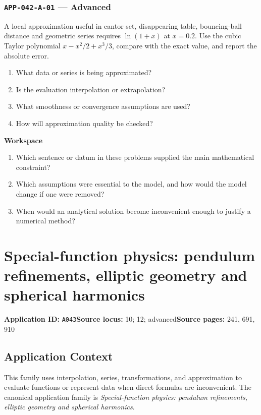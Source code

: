 \documentclass[11pt]{book}
\newcommand{\pid}[1]{\texttt{#1}}
\newcommand{\workspace}{\par\vspace{0.7in}\hrulefill\par\vspace{0.55in}\hrulefill\par}
\begin{document}
\subsection*{\pid{APP-042-A-01} — Advanced}
\begin{problembox}
A local approximation useful in cantor set, disappearing table, bouncing-ball distance and geometric series requires $\ln(1+x)$ at $x=0.2$. Use the cubic Taylor polynomial $x-x^2/2+x^3/3$, compare with the exact value, and report the absolute error.
\end{problembox}
\begin{promptbox}\begin{enumerate}
\item What data or series is being approximated?
\item Is the evaluation interpolation or extrapolation?
\item What smoothness or convergence assumptions are used?
\item How will approximation quality be checked?
\end{enumerate}\end{promptbox}
\textbf{Workspace}\workspace
\begin{reflectionbox}\begin{enumerate}
\item Which sentence or datum in these problems supplied the main mathematical constraint?
\item Which assumptions were essential to the model, and how would the model change if one were removed?
\item When would an analytical solution become inconvenient enough to justify a numerical method?
\end{enumerate}\end{reflectionbox}
\chapter{Special-function physics: pendulum refinements, elliptic geometry and spherical harmonics}\label{app:A043}
\textbf{Application ID:} \pid{A043}\quad \textbf{Source locus:} 10; 12; advanced\quad \textbf{Source pages:} 241, 691, 910
\section*{Application Context}
This family uses interpolation, series, transformations, and approximation to evaluate functions or represent data when direct formulas are inconvenient. The canonical application family is \emph{Special-function physics: pendulum refinements, elliptic geometry and spherical harmonics}.
\end{document}
